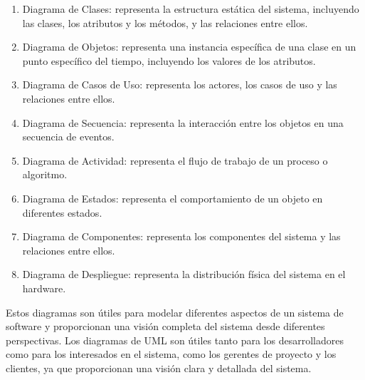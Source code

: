 \documentclass[executivepaper]{article}
\begin{document}
\begin{enumerate}
\item Diagrama de Clases: representa la estructura estática del sistema, incluyendo las clases, los atributos y los métodos, y las relaciones entre ellos.
\item Diagrama de Objetos: representa una instancia específica de una clase en un punto específico del tiempo, incluyendo los valores de los atributos.
\item Diagrama de Casos de Uso: representa los actores, los casos de uso y las relaciones entre ellos.
\item Diagrama de Secuencia: representa la interacción entre los objetos en una secuencia de eventos.
\item Diagrama de Actividad: representa el flujo de trabajo de un proceso o algoritmo.
\item Diagrama de Estados: representa el comportamiento de un objeto en diferentes estados.
\item Diagrama de Componentes: representa los componentes del sistema y las relaciones entre ellos.
\item Diagrama de Despliegue: representa la distribución física del sistema en el hardware.
\end{enumerate}

Estos diagramas son útiles para modelar diferentes aspectos de un sistema de software y proporcionan una visión completa del sistema desde diferentes perspectivas. Los diagramas de UML son útiles tanto para los desarrolladores como para los interesados en el sistema, como los gerentes de proyecto y los clientes, ya que proporcionan una visión clara y detallada del sistema.
\end{document}
